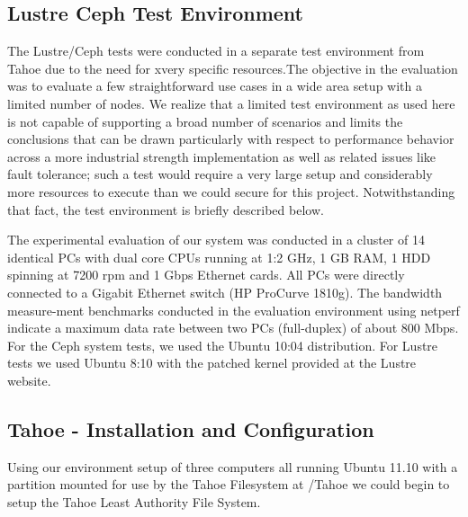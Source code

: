 \documentclass[11pt]{article}
\begin{document}
\subsection{Lustre Ceph Test Environment}
The Lustre/Ceph tests were conducted in a separate test environment from
Tahoe due to the need for xvery specific resources.The objective in the 
evaluation was to evaluate a few straightforward use cases in a wide area 
setup with a limited number of nodes. We realize that a limited test 
environment as used here is not capable of supporting a broad number of 
scenarios and limits the conclusions that can be drawn particularly with 
respect to performance behavior across a more industrial strength 
implementation as well as related issues like fault tolerance; such a test 
would require a very large setup and considerably more resources to execute 
than we could secure for this project. Notwithstanding that fact, the test 
environment is briefly described below. 

The experimental evaluation of our system was conducted in a cluster of 14 
identical PCs with dual core CPUs running at 1:2 GHz, 1 GB RAM, 1 HDD 
spinning at 7200 rpm and 1 Gbps Ethernet cards. All PCs were directly 
connected to a Gigabit Ethernet switch (HP ProCurve 1810g). The bandwidth 
measure-ment benchmarks conducted in the evaluation environment using netperf 
indicate a maximum data rate between two PCs (full-duplex) of about 800 Mbps. 
For the Ceph system tests, we used the Ubuntu 10:04 distribution. For Lustre 
tests we used Ubuntu 8:10 with the patched kernel provided at the Lustre 
website.

\subsection{Tahoe - Installation and Configuration}

Using our environment setup of three computers all running Ubuntu
11.10 with a partition mounted for use by the Tahoe Filesystem at
/Tahoe we could begin to setup the Tahoe Least Authority File System.
\end{document}
